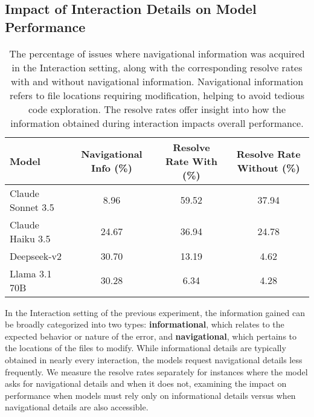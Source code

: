 \subsection{Impact of Interaction Details on Model Performance}
\begin{table*}[ht]
\centering
\begin{tabular}{lccc}
\toprule
\textbf{Model} & \textbf{Navigational Info (\%)} & \textbf{Resolve Rate With (\%)} & \textbf{Resolve Rate Without (\%)} \\
\midrule
Claude Sonnet 3.5 & 8.96  & 59.52 & 37.94 \\
Claude Haiku 3.5  & 24.67 & 36.94 & 24.78 \\
Deepseek-v2     & 30.70 & 13.19 & 4.62  \\
Llama 3.1 70B     & 30.28 & 6.34  & 4.28  \\
\bottomrule
\end{tabular}
\caption{The percentage of issues where navigational information was acquired in the Interaction setting, along with the corresponding resolve rates with and without navigational information. Navigational information refers to file locations requiring modification, helping to avoid tedious code exploration. The resolve rates offer insight into how the information obtained during interaction impacts overall performance.}
\vspace{-15pt}

\label{tab:navigational_questions_files}
\end{table*}

In the Interaction setting of the previous experiment, the information gained can be broadly categorized into two types: \textbf{informational}, which relates to the expected behavior or nature of the error, and \textbf{navigational}, which pertains to the locations of the files to modify. While informational details are typically obtained in nearly every interaction, the models request navigational details less frequently. We measure the resolve rates separately for instances where the model asks for navigational details and when it does not, examining the impact on performance when models must rely only on informational details versus when navigational details are also accessible.


